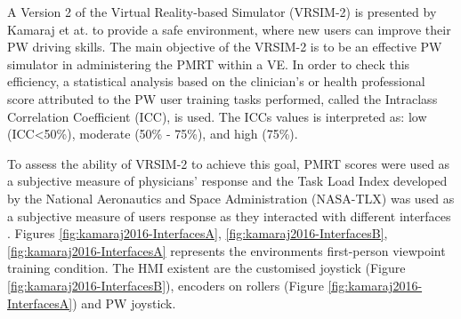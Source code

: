 A Version 2 of the Virtual Reality-based Simulator (VRSIM-2) is presented by Kamaraj et at. \cite{kamaraj2016} to provide a safe environment, where new users can improve their PW driving skills. The main objective of the VRSIM-2 is to be an effective PW simulator in administering the PMRT  within a VE. In order to check this efficiency, a statistical analysis based on the clinician's or health professional score attributed to the PW user training tasks performed, called the Intraclass Correlation Coefficient (ICC), is used.  The ICCs values is interpreted as:  low (ICC<50\%), moderate (50\% - 75\%), and high (75\%).

To assess the ability of VRSIM-2 to achieve this goal, PMRT scores were used as a subjective measure of physicians' response and the Task Load Index developed by the National Aeronautics and Space Administration (NASA-TLX) was used as a subjective measure of users response as they interacted with different interfaces \cite{rubio2004}. Figures \ref{fig:kamaraj2016-InterfacesA}, \ref{fig:kamaraj2016-InterfacesB}, \ref{fig:kamaraj2016-InterfacesA} represents the environments first-person viewpoint training condition. The HMI existent are the customised joystick (Figure \ref{fig:kamaraj2016-InterfacesB}), encoders on rollers (Figure \ref{fig:kamaraj2016-InterfacesA}) and PW joystick. 

